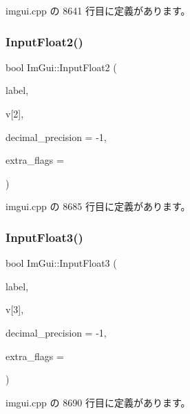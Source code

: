  imgui.\+cpp の 8641 行目に定義があります。

\mbox{\label{namespace_im_gui_a0c7aea6408696de9696f38a2f32419c4}} 
\subsubsection{\texorpdfstring{Input\+Float2()}{InputFloat2()}}
{\footnotesize\ttfamily bool Im\+Gui\+::\+Input\+Float2 (\begin{DoxyParamCaption}\item[{const char $\ast$}]{label,  }\item[{float}]{v\mbox{[}2\mbox{]},  }\item[{int}]{decimal\+\_\+precision = {\ttfamily -\/1},  }\item[{\mbox{\hyperlink{imgui_8h_a7d2c6153a6b9b5d3178ce82434ac9fb8}{Im\+Gui\+Input\+Text\+Flags}}}]{extra\+\_\+flags = {} }\end{DoxyParamCaption})}



 imgui.\+cpp の 8685 行目に定義があります。

\mbox{\label{namespace_im_gui_a77e8d23f2e0477d11a7eb6b0aa773eb9}} 
\subsubsection{\texorpdfstring{Input\+Float3()}{InputFloat3()}}
{\footnotesize\ttfamily bool Im\+Gui\+::\+Input\+Float3 (\begin{DoxyParamCaption}\item[{const char $\ast$}]{label,  }\item[{float}]{v\mbox{[}3\mbox{]},  }\item[{int}]{decimal\+\_\+precision = {\ttfamily -\/1},  }\item[{\mbox{\hyperlink{imgui_8h_a7d2c6153a6b9b5d3178ce82434ac9fb8}{Im\+Gui\+Input\+Text\+Flags}}}]{extra\+\_\+flags = {} }\end{DoxyParamCaption})}



 imgui.\+cpp の 8690 行目に定義があります。

\mbox{\label{namespace_im_gui_a2c9bbb9a99bd8fee134a196fd1ec3dfb}} 
